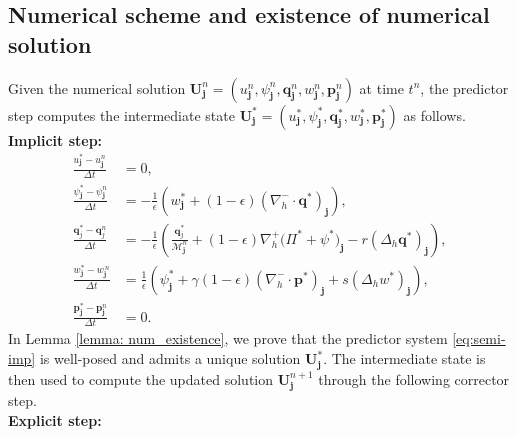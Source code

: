 \documentclass[11pt]{article}
\numberwithin{equation}{section}
\newtheorem{counter example}[theorem]{Counter Example}
\numberwithin{equation}{section}
\numberwithin{equation}{section}
\begin{document}
\subsection{Numerical scheme and existence of numerical solution}\label{sec: scheme}
Given the numerical solution $\mathbf{U}_{\mathbf{j}}^n=(u_{\mathbf{j}}^n,\psi_{\mathbf{j}}^n,\mathbf{q}_{\mathbf{j}}^n,w_{\mathbf{j}}^n,\mathbf{p}_{\mathbf{j}}^n)$ at time $t^n$, the predictor step computes the intermediate state $\mathbf{U}_{\mathbf{j}}^*=(u_{\mathbf{j}}^{*},\psi^*_{\mathbf{j}},\mathbf{q}_{\mathbf{j}}^{*},w_{\mathbf{j}}^{*},\mathbf{p}_{\mathbf{j}}^{*})$ as follows.\medskip \\
\textbf{Implicit step:}
\begin{subequations}
\label{eq:semi-imp}
\begin{align}
\frac{u_{\mathbf{j}}^{*} - u_{\mathbf{j}}^n}{\Delta t} &= 0, 
\label{eq:h_updt_star}\\
\frac{\psi^*_{\mathbf{j}} - \psi_{\mathbf{j}}^n}{\Delta t} 
&= -\frac{1}{\epsilon}
\left(
w^*_{\mathbf{j}}+(1-\epsilon)(\nabla_h^- \cdot \mathbf{q}^{*})_{\mathbf{j}}
\right),
\label{eq:psi_updt_star}\\
\frac{\mathbf{q}_{j}^{*}-\mathbf{q}_{j}^{n}}{\Delta t} 
&= -\frac{1}{\epsilon}
\left(
\frac{\mathbf{q}_{j}^{*}}{\mathcal{M}_{\mathbf{j}}^n}
+(1-\epsilon)\nabla_h^+ \bigl(\Pi^*+\psi^{*}\bigr)_{\mathbf{j}}
-r(\Delta_{h} \mathbf{q}^{*})_{\mathbf{j}}
\right),
\label{eq:q_updt_star}\\
\frac{w_{\mathbf{j}}^{*} - w_{\mathbf{j}}^{\,n}}{\Delta t} 
&= \frac{1}{\epsilon}
\left(
\psi^*_{\mathbf{j}}
+\gamma(1-\epsilon)(\nabla_h^- \cdot \mathbf{p}^{*})_{\mathbf{j}}
+s(\Delta_{h}w^{*})_{\mathbf{j}}
\right),
\label{eq:w_updt_star}\\
\frac{\mathbf{p}_{\mathbf{j}}^{*} - \mathbf{p}_{\mathbf{j}}^n}{\Delta t} &= 0.
\label{eq:p_updt_star}
\end{align}
\end{subequations}
In Lemma \ref{lemma: num_existence}, we prove that the predictor system \eqref{eq:semi-imp} is well-posed and admits a unique solution $\mathbf{U}_{\mathbf{j}}^*.$
The intermediate state is then used to compute the updated solution $\mathbf{U}_{\mathbf{j}}^{n+1}$ through the following corrector step.\medskip\\
\textbf{Explicit step:}
\end{document}
